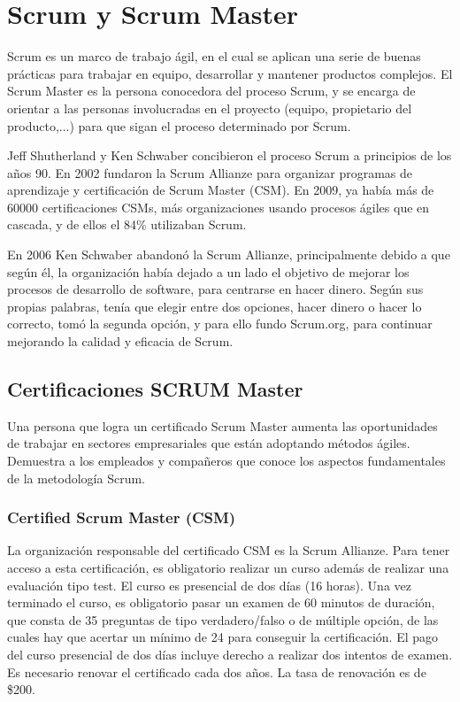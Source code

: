 \newpage{}
\section{Scrum y Scrum Master}

Scrum es un marco de trabajo ágil, en el cual se aplican una serie de buenas prácticas para trabajar en equipo, desarrollar y mantener productos complejos. El Scrum Master es la persona conocedora del proceso Scrum, y se encarga de orientar a las personas involucradas en el proyecto (equipo, propietario del producto,...) para que sigan el proceso determinado por Scrum.

Jeff Shutherland y Ken Schwaber concibieron el proceso Scrum a principios de los años 90. En 2002 fundaron la Scrum Allianze para organizar programas de aprendizaje y certificación de Scrum Master (CSM). En 2009, ya había más de 60000 certificaciones CSMs, más organizaciones usando procesos ágiles que en cascada, y de ellos el 84\% utilizaban Scrum.

En 2006 Ken Schwaber abandonó la Scrum Allianze, principalmente debido a que según él, la organización había dejado a un lado el objetivo de mejorar los procesos de desarrollo de software, para centrarse en hacer dinero. Según sus propias palabras, tenía que elegir entre dos opciones, hacer dinero o hacer lo correcto, tomó la segunda opción, y para ello fundo Scrum.org, para continuar mejorando la calidad y eficacia de Scrum.

\subsection{Certificaciones SCRUM Master}

Una persona que logra un certificado Scrum Master aumenta las oportunidades de trabajar en sectores empresariales que están adoptando métodos ágiles. Demuestra a los empleados y compañeros que conoce los aspectos fundamentales de la metodología Scrum.


\subsubsection{Certified Scrum Master (CSM)}

La organización responsable del certificado CSM es la Scrum Allianze. Para tener acceso a esta certificación, es obligatorio realizar un curso además de realizar una evaluación tipo test. El curso es presencial de dos días (16 horas). Una vez terminado el curso, es obligatorio pasar un examen de 60 minutos de duración, que consta de 35 preguntas de tipo verdadero/falso o de múltiple opción, de las cuales hay que acertar un mínimo de 24 para conseguir la certificación. El pago del curso presencial de dos días incluye derecho a realizar dos intentos de examen. Es necesario renovar el certificado cada dos años. La tasa de renovación es de \$200.


